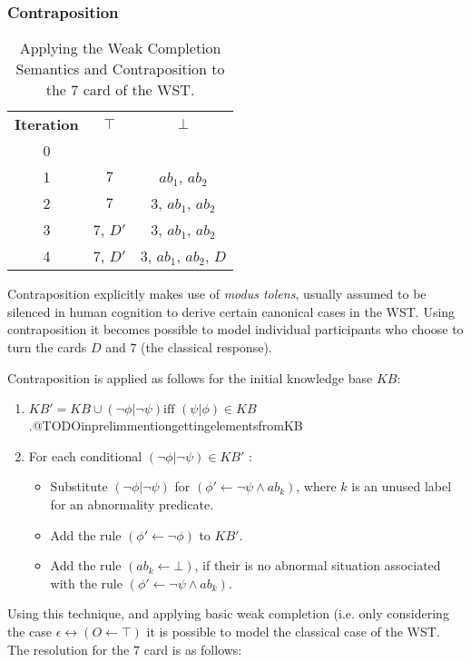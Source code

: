 \subsubsection*{Contraposition}
\begin{table}
\begin{center}
\begin{tabular}{ c c c }
 \textbf{Iteration} & \textbf{$\top$} & \textbf{$\bot$} \\ 
 0 &  &  \\  
 1 &  $7$ & $ab_1$, $ab_2$  \\  
 2 &  $7$ & $3$, $ab_1$, $ab_2$  \\
 3 &  $7$, $D'$ & $3$, $ab_1$, $ab_2$  \\
 4 &  $7$, $D'$ & $3$, $ab_1$, $ab_2$, $D$  
\end{tabular}
\caption{Applying the Weak Completion Semantics and Contraposition to the $7$ card of the WST.}
\label{tbl:7cont}
\end{center}
\end{table}

Contraposition explicitly makes use of \textit{modus tolens}, usually assumed to be silenced in human cognition to derive certain canonical cases in the WST. Using contraposition it becomes possible to model individual participants who choose to turn the cards $D$ and $7$ (the classical response).

Contraposition is applied as follows for the initial knowledge base $KB$:
\begin{enumerate}
\item $KB'=KB\cup(\lnot \phi|\lnot \psi) \textrm{iff } (\psi|\phi)\in KB$.@TODOinprelimmentiongettingelementsfromKB
\item For each conditional $(\lnot \phi| \lnot \psi)\in KB'$ :
\begin{itemize}
\item Substitute $(\lnot \phi| \lnot \psi)$ for $(\phi' \leftarrow \lnot \psi \land \textit{ab}_k)$, where $k$ is an unused label for an abnormality predicate.
\item Add the rule $(\phi' \leftarrow \lnot \phi)$ to $KB'$.
\item Add the rule $(\textit{ab}_k\leftarrow \bot)$, if their is no abnormal situation associated with the rule $(\phi' \leftarrow \lnot \psi \land \textit{ab}_k)$.
\end{itemize}
\end{enumerate}

Using this technique, and applying basic weak completion (i.e. only considering the case $\epsilon\leftrightarrow(O\leftarrow \top)$ it is possible to model the classical case of the WST. The resolution for the $7$ card is as follows:

